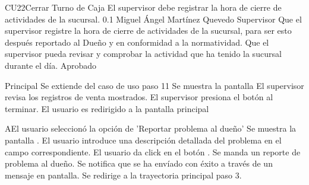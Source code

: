 \begin{UseCase}{CU22}{Cerrar Turno de Caja}
{
    El supervisor debe registrar la hora de cierre de actividades de la sucursal.
}
    {
	\color{Gray} 0.1
    }
    {
	\color{Gray} Miguel \'Angel Mart\'inez Quevedo
    }
    {
	\color{Gray}
    }
    {
	Supervisor
    }
    {
	Que el supervisor registre la hora de cierre de actividades de la sucursal, para ser esto
	despu\'es reportado al Due\~no y en conformidad a la normatividad.
	Que el supervisor pueda revisar y comprobar la actividad que ha tenido la sucursal durante
	el d\'ia.
    }
    {
    }
    {
    }
    {}
    {}
    {
    }
    {}
    {}
    {}
    {}
    {
		Aprobado
	}
\end{UseCase}

\begin{UCtrayectoria}{Principal}
    \UCpaso Se extiende del caso de uso  paso 11
    \UCpaso Se muestra la pantalla 
    \UCpaso El supervisor revisa los registros de venta mostrados.
    \UCpaso El supervisor presiona el bot\'on  al terminar.
    \UCpaso El usuario es redirigido a la pantalla principal 
\end{UCtrayectoria}

\begin{UCtrayectoriaA}{A}{El usuario seleccion\'o la opci\'on de 'Reportar problema al due\~no'}
    \UCpaso Se muestra la pantalla .
    \UCpaso El usuario introduce una descripci\'on detallada del problema en el campo
    correspondiente.
    \UCpaso El usuario da click en el bot\'on .
    \UCpaso Se manda un reporte de problema al due\~no.
    \UCpaso Se notifica que se ha env\'iado con \'exito a trav\'es de un mensaje en pantalla.
    \UCpaso Se redirige a la trayectoria principal paso 3.
\end{UCtrayectoriaA}

